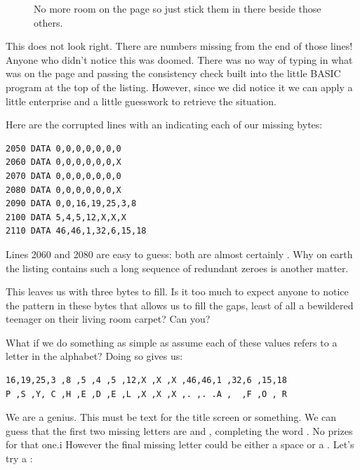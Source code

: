 \begin{figure}[H]
    \centering
    \begin{adjustbox}{width=7cm,center}
    \end{adjustbox}
  \caption{No more room on the page so just stick them in there beside those others.}
\end{figure}

This does not look right. There are numbers missing from the end of those lines! Anyone who didn't notice
this was doomed. There was no way of typing in what was on the page and passing the consistency check
built into the little BASIC program at the top of the listing. However, since we did notice it we can apply
a little enterprise and a little guesswork to retrieve the situation.

Here are the corrupted lines with an  indicating each of our missing bytes:

\lstset{style=C64BasicStyle}
\begin{lstlisting}
2050 DATA 0,0,0,0,0,0,0 
2060 DATA 0,0,0,0,0,0,X
2070 DATA 0,0,0,0,0,0,0 
2080 DATA 0,0,0,0,0,0,X
2090 DATA 0,0,16,19,25,3,8 
2100 DATA 5,4,5,12,X,X,X
2110 DATA 46,46,1,32,6,15,18
\end{lstlisting}

Lines 2060 and 2080 are easy to guess: both are almost certainly . Why on earth the listing contains such
a long sequence of redundant zeroes is another matter. 

This leaves us with three bytes to fill. Is it too much to expect anyone to notice the pattern in these bytes that 
allows us to fill the gaps, least of all a bewildered teenager on their living room carpet? Can you? 


What if we do something as simple as assume each of these values refers to a letter in the alphabet? Doing so gives
us:

\begin{lstlisting}
16,19,25,3 ,8 ,5 ,4 ,5 ,12,X ,X ,X ,46,46,1 ,32,6 ,15,18
P ,S ,Y, C ,H ,E ,D ,E ,L ,X ,X ,X ,. ,. .A ,  ,F ,O , R
\end{lstlisting}

We are a genius. This must be text for the title screen or something. We can guess that the first two missing letters
are  and , completing the word . No prizes for that one.i However the final missing
letter could be either a space or a . Let's try a :

